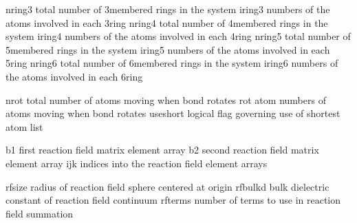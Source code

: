 \documentclass[letterpaper,11pt,english]{sphinxmanual}
\begin{document}

\begin{sphinxVerbatim}[commandchars=\\\{\}]
nring3          total number of 3\PYGZhy{}membered rings in the system
iring3          numbers of the atoms involved in each 3\PYGZhy{}ring
nring4          total number of 4\PYGZhy{}membered rings in the system
iring4          numbers of the atoms involved in each 4\PYGZhy{}ring
nring5          total number of 5\PYGZhy{}membered rings in the system
iring5          numbers of the atoms involved in each 5\PYGZhy{}ring
nring6          total number of 6\PYGZhy{}membered rings in the system
iring6          numbers of the atoms involved in each 6\PYGZhy{}ring
\end{sphinxVerbatim}


\begin{sphinxVerbatim}[commandchars=\\\{\}]
nrot            total number of atoms moving when bond rotates
rot             atom numbers of atoms moving when bond rotates
use\PYGZus{}short       logical flag governing use of shortest atom list
\end{sphinxVerbatim}


\begin{sphinxVerbatim}[commandchars=\\\{\}]
b1              first reaction field matrix element array
b2              second reaction field matrix element array
ijk             indices into the reaction field element arrays
\end{sphinxVerbatim}


\begin{sphinxVerbatim}[commandchars=\\\{\}]
rfsize          radius of reaction field sphere centered at origin
rfbulkd         bulk dielectric constant of reaction field continuum
rfterms         number of terms to use in reaction field summation
\end{sphinxVerbatim}

\end{document}
